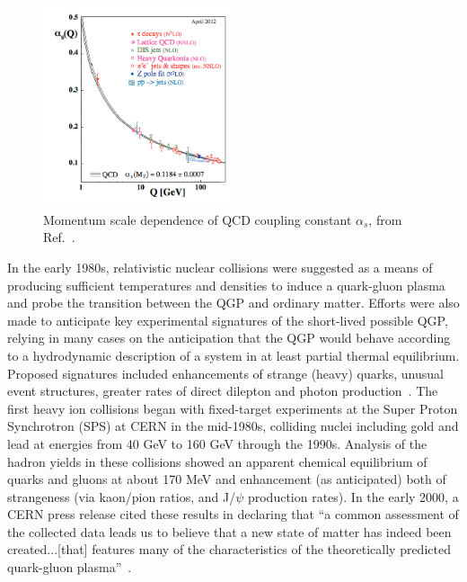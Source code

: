 \begin{figure}[h!]
\begin{center}
\includegraphics[width=0.5\textwidth]{figures/Theory/Alpha_s.png}
\caption[QCD coupling constant $\alpha_{s}$]{Momentum scale dependence of QCD coupling constant $\alpha_{s}$, from Ref.~\cite{Bethke:2012jm}.}
\label{fig:alpha_s}
\end{center}
\end{figure}

In the early 1980s, relativistic nuclear collisions were suggested as a means of producing sufficient temperatures and densities to induce a quark-gluon plasma and probe the transition between the QGP and ordinary matter.  Efforts were also made to anticipate key experimental signatures of the short-lived possible QGP, relying in many cases on the anticipation that the QGP would behave according to a hydrodynamic description of a system in at least partial thermal equilibrium.  Proposed signatures included enhancements of strange (heavy) quarks, unusual event structures, greater rates of direct dilepton and photon production~\cite{Bjorken:1983}.  The first heavy ion collisions began with fixed-target experiments at the Super Proton Synchrotron (SPS) at CERN in the mid-1980s, colliding nuclei including gold and lead at energies from 40 GeV to 160 GeV through the 1990s.  Analysis of the hadron yields in these collisions showed an apparent chemical equilibrium of quarks and gluons at about 170 MeV and enhancement (as anticipated) both of strangeness (via kaon/pion ratios, and J/$\psi$ production rates).  In the early 2000, a CERN press release cited these results in declaring that ``a common assessment of the collected data leads us to believe that a new state of matter has indeed been created...[that] features many of the characteristics of the theoretically predicted quark-gluon plasma''~\cite{Heinz:2000bk}.

